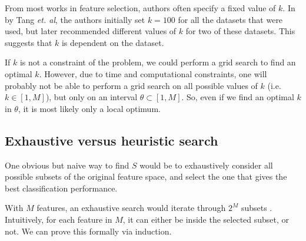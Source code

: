 \documentclass[12pt, twoside, a4paper]{report}
\begin{document}
From most works in feature selection, authors often specify a fixed value of $k$. In \cite{RefWorks:119} by Tang \textit{et. al}, the authors initially set $k=100$ for all the datasets that were used, but later recommended different values of $k$ for two of these datasets. This suggests that $k$ is dependent on the dataset.

If $k$ is not a constraint of the problem, we could perform a grid search to find an optimal $k$. However, due to time and computational constraints, one will probably not be able to perform a grid search on all possible values of $k$ (i.e. $k \in [1, M]$), but only on an interval $\theta \subset [1, M]$. So, even if we find an optimal $k$ in $\theta$, it is most likely only a local optimum.


\subsection{Exhaustive versus heuristic search} \label{bg:fs:exhaustive}

One obvious but naive way to find $S$ would be to exhaustively consider all possible subsets of the original feature space, and select the one that gives the best classification performance.

With $M$ features, an exhaustive search would iterate through $2^M$ subsets \cite{RefWorks:182}. Intuitively, for each feature in $M$, it can either be inside the selected subset, or not. We can prove this formally via induction.
\end{document}
